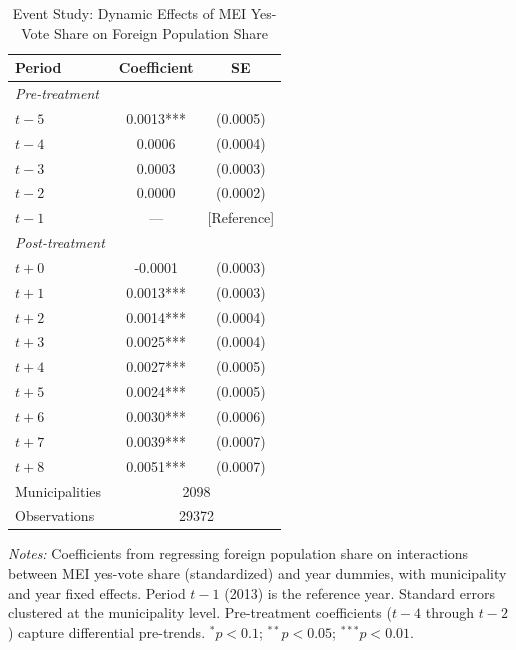 \begin{table}[htbp]
\centering
\caption{Event Study: Dynamic Effects of MEI Yes-Vote Share on Foreign Population Share}
\label{tab:event_study}
\begin{tabular}{lcc}
\hline\hline
Period & Coefficient & SE \\
\hline
\emph{Pre-treatment} & & \\
$t-5$ & 0.0013*** & (0.0005) \\
$t-4$ & 0.0006 & (0.0004) \\
$t-3$ & 0.0003 & (0.0003) \\
$t-2$ & 0.0000 & (0.0002) \\
$t-1$ & --- & [Reference] \\
\hline
\emph{Post-treatment} & & \\
$t+0$ & -0.0001 & (0.0003) \\
$t+1$ & 0.0013*** & (0.0003) \\
$t+2$ & 0.0014*** & (0.0004) \\
$t+3$ & 0.0025*** & (0.0004) \\
$t+4$ & 0.0027*** & (0.0005) \\
$t+5$ & 0.0024*** & (0.0005) \\
$t+6$ & 0.0030*** & (0.0006) \\
$t+7$ & 0.0039*** & (0.0007) \\
$t+8$ & 0.0051*** & (0.0007) \\
\hline
Municipalities & \multicolumn{2}{c}{2098} \\
Observations & \multicolumn{2}{c}{29372} \\
\hline\hline
\end{tabular}
\begin{tablenotes}[flushleft]\footnotesize
\item \textit{Notes:} Coefficients from regressing foreign population share on interactions between MEI yes-vote share (standardized) and year dummies, with municipality and year fixed effects. Period $t-1$ (2013) is the reference year. Standard errors clustered at the municipality level. Pre-treatment coefficients ($t-4$ through $t-2$) capture differential pre-trends. $^{*}p<0.1$; $^{**}p<0.05$; $^{***}p<0.01$.
\end{tablenotes}
\end{table}

